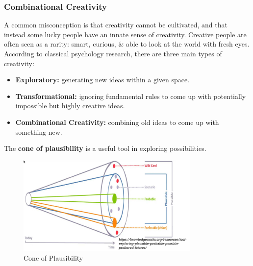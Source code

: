 \documentclass[a4paper,11pt]{article}
\begin{document}
\subsubsection{Combinational Creativity}
A common misconception is that creativity cannot be cultivated, and that instead some lucky people have an innate sense of
creativity.
Creative people are often seen as a rarity: smart, curious, \& able to look at the world with fresh eyes.
According to classical psychology research, there are three main types of creativity:
\begin{itemize}
    \item   \textbf{Exploratory:} generating new ideas within a given space.
    \item   \textbf{Transformational:} ignoring fundamental rules to come up with potentially impossible but highly creative
            ideas.
    \item   \textbf{Combinational Creativity:} combining old ideas to come up with something new.
\end{itemize}

The \textbf{cone of plausibility} is a useful tool in exploring possibilities.
\begin{figure}[H]
    \centering
    \includegraphics[width=0.8\textwidth]{images/cone.png}
    \caption{Cone of Plausibility}
\end{figure}
\end{document}
